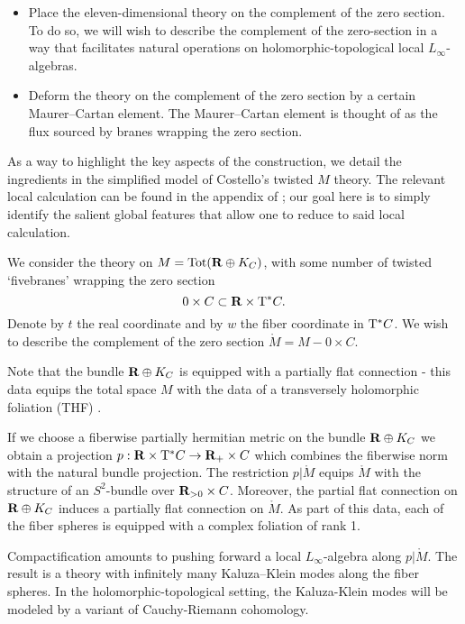 \begin{itemize}
  \item Place the eleven-dimensional theory on the complement of the zero section. To do so, we will wish to describe the complement of the zero-section in a way that facilitates natural operations on holomorphic-topological local $L_{\infty}$-algebras.

  \item Deform the theory on the complement of the zero section by a certain Maurer--Cartan element.
  The Maurer--Cartan element is thought of as the flux sourced by branes wrapping the zero section.
\end{itemize}

\parsec[s:brkevin]
As a way to highlight the key aspects of the construction, we detail the ingredients in the simplified model of Costello's twisted $M$ theory. The relevant local calculation can be found in the appendix of \cite{}; our goal here is to simply identify the salient global features that allow one to reduce to said local calculation.

We consider the theory on $M = \text{Tot} (\mathbf{R}\oplus K_{C})$, with some number of twisted `fivebranes' wrapping the zero section
\[
0 \times C \subset \mathbf{R} \times {\rm T}^* C .
\]
Denote by $t$ the real coordinate and by $w$ the fiber coordinate in ${\rm T}^* C$. We wish to describe the complement of the zero section $\mathring M = M - 0 \times C$.

Note that the bundle $\mathbf{R}\oplus K_{C}$ is equipped with a partially flat connection - this data equips the total space $M$ with the data of a transversely holomorphic foliation (THF) \cite{DuchampKalka}.

If we choose a fiberwise partially hermitian metric on the bundle $\mathbf{R} \oplus K_C$ we obtain a projection $p: \mathbf{R} \times {\rm T}^*C \to \mathbf{R}_{+} \times C$ which combines the fiberwise norm with the natural bundle projection. The restriction $p| \mathring M$ equips $\mathring M$ with the structure of an $S^{2}$-bundle over $\mathbf{R}_{>0}\times C$. Moreover, the partial flat connection on $\mathbf{R}\oplus K_{C}$ induces a partially flat connection on $\mathring M$. As part of this data, each of the fiber spheres is equipped with a complex foliation of rank 1.

Compactification amounts to pushing forward a local $L_{\infty}$-algebra along $p| \mathring M$. The result is a theory with infinitely many Kaluza--Klein modes along the fiber spheres. In the holomorphic-topological setting, the Kaluza-Klein modes will be modeled by a variant of Cauchy-Riemann cohomology.

